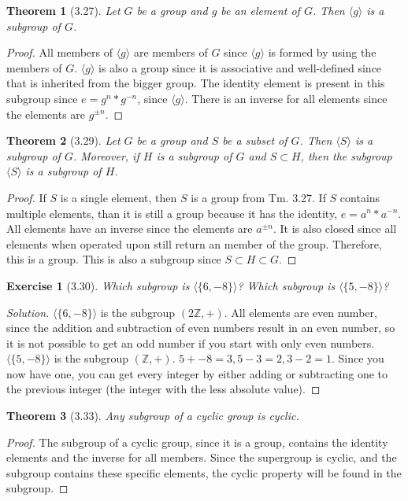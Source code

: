 \documentclass{article}
\newtheorem*{thm}{Theorem}
\newtheorem*{ex}{Exercise}
\newenvironment{solution}
  {\begin{proof}[Solution]}
  {\renewcommand{\qedsymbol}{}\end{proof}}
\begin{document}
\begin{thm}[3.27]
	Let $G$ be a group and $g$ be an element of $G$. Then $\langle g \rangle$ is a subgroup of $G$. 
\end{thm}
\begin{proof}
	All members of $\langle g \rangle$ are members of $G$ since $\langle g \rangle$ is formed by using the members of $G$. $\langle g \rangle$
	is also a group since it is associative and well-defined since that is inherited from the bigger group. The identity element 
	is present in this subgroup since $e = g^n * g^{-n}$, since $\langle g \rangle$. There is an inverse for all elements since the elements
	are $g^{\pm n}$. 
\end{proof}

\begin{thm}[3.29]
	Let $G$ be a group and $S$ be a subset of $G$. Then $\langle S \rangle$ is a subgroup of $G$. Moreover, if $H$ is a subgroup of $G$ and 
	$S\subset H$, then the subgroup $\langle S \rangle$ is a subgroup of $H$.
\end{thm}
\begin{proof}
	If $S$ is a single element, then $S$ is a group from Tm. 3.27. If $S$ contains multiple elements, than it is still a group because
	it has the identity, $e = a^n * a^{-n}$. All elements have an inverse since the elements are $a^{\pm n}$. It is also closed since all elements
	when operated upon still return an member of the group. Therefore, this is a group. This is also a subgroup since $S\subset H \subset G$. 
\end{proof}

\begin{ex}[3.30]
	Which subgroup is $\langle \{6, -8\}\rangle$? Which subgroup is $\langle \{5,-8\} \rangle$?
\end{ex}
\begin{solution}
	 $\langle \{6, -8\}\rangle$ is the subgroup $(2\mathbb{Z}, +)$. All elements are even number, since the addition and subtraction of
	 even numbers result in an even number, so it is not possible to get an odd number if you start with only even numbers.
	  $\langle \{5,-8\} \rangle$ is the subgroup $(\mathbb{Z}, +)$. $5+ - 8 = 3, 5-3=2, 3-2=1$. Since you now have one, you can get every integer
	  by either adding or subtracting one to the previous integer (the integer with the less absolute value). 
\end{solution}

\begin{thm}[3.33]
	Any subgroup of a cyclic group is cyclic. 
\end{thm}
\begin{proof}
	The subgroup of a cyclic group, since it is a group, contains the identity elements and the inverse for all members. Since the supergroup
	is cyclic, and the subgroup contains these specific elements, the cyclic property will be found in the subgroup. 
\end{proof}
\end{document}
